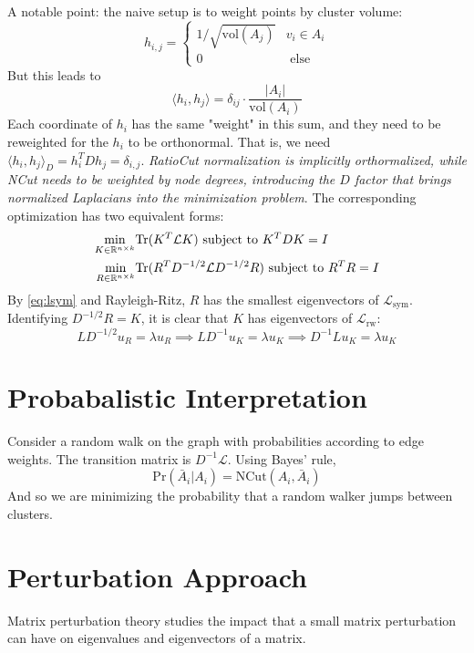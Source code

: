 \documentclass{article}
\begin{document}
A notable point: the naive setup is to weight points by cluster volume:
\begin{equation}
    h_{i,j } = \begin{cases} 
    1/\sqrt{\text{vol}(A_j)} & v_i \in A_i \\
    0 & \text{ else}
    \end{cases}
\end{equation}
But this leads to
\begin{equation}
     \langle h_i, h_j \rangle = \delta_{ij} \cdot \frac{|A_i|}{\text{vol}(A_i)}
\end{equation}
Each coordinate of $h_i$ has the same "weight" in this sum, and they need to be reweighted for the $h_i$ to be orthonormal. That is, we need $\langle h_i, h_j\rangle_D = h_i^T D h_j = \delta_{i,j}$. \textit{RatioCut normalization is implicitly orthormalized, while NCut needs to be weighted by node degrees, introducing the $D$ factor that brings normalized Laplacians into the minimization problem}. The corresponding optimization has two equivalent forms:
\begin{align}
     \min_{K \in {\mathbb R}^{n \times k}} & \text{Tr}(K^T \mathcal{L} K) \text{ subject to } K^T D K = I \label{eq:lrw} \\
     \min_{R \in {\mathbb R}^{n \times k}} & \text{Tr}(R^T D^{-1/2} \mathcal{L} D^{-1/2} R)  \text{ subject to } R^T R = I  \label{eq:lsym}
\end{align}
By \eqref{eq:lsym} and Rayleigh-Ritz, $R$ has the smallest eigenvectors of $\mathcal{L}_{\text{sym}}$. Identifying $D^{-1/2}R = K$, it is clear that $K$ has eigenvectors of $\mathcal{L}_{\text{rw}}$:
\begin{equation}
    LD^{-1/2} u_R = \lambda u_R \implies LD^{-1}u_K = \lambda u_K \implies D^{-1} L u_K = \lambda u_K
\end{equation}
\section{Probabalistic Interpretation}
Consider a random walk on the graph with probabilities according to edge weights. The transition matrix is $
D^{-1} \mathcal{L}$. Using Bayes' rule, 
\begin{equation}
    \text{Pr}(\bar{A}_i | A_i) = \text{NCut}(A_i, \bar{A}_i)
\end{equation}
And so we are minimizing the probability that a random walker jumps between clusters.

\section{Perturbation Approach}
Matrix perturbation theory studies the impact that a small matrix perturbation can have on eigenvalues and eigenvectors of a matrix. 
\end{document}

